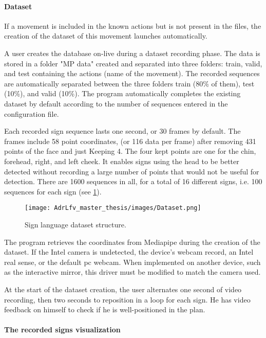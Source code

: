\paragraph{Dataset}

If a movement is included in the known actions but is not present in the files, the creation of the dataset of this movement launches automatically. 

A user creates the database on-live during a dataset recording phase. The data is stored in a folder "MP data" created and separated into three folders: train, valid, and test containing the actions (name of the movement). The recorded sequences are automatically separated between the three folders train (80\% of them), test (10\%), and valid (10\%). The program automatically completes the existing dataset by default according to the number of sequences entered in the configuration file.




Each recorded sign sequence lasts one second, or 30 frames by default. The frames include 58 point coordinates, (or 116 data per frame) after removing 431 points of the face and just Keeping 4. The four kept points are one for the chin, forehead, right, and left cheek. It enables signs using the head to be better detected without recording a large number of points that would not be useful for detection. There are 1600 sequences in all, for a total of 16 different signs, i.e. 100 sequences for each sign (see \ref{fig:slr_dataset}).

\begin{figure}[h]
    \centering
    \texttt{[image: AdrLfv\_master\_thesis/images/Dataset.png]}
    \caption{Sign language dataset structure.}
    \label{fig:slr_dataset}
\end{figure}

The program retrieves the coordinates from Mediapipe during the creation of the dataset. If the Intel camera is undetected, the device's webcam record, an Intel real sense, or the default pc webcam. When implemented on another device, such as the interactive mirror, this driver must be modified to match the camera used.

At the start of the dataset creation, the user alternates one second of video recording, then two seconds to reposition in a loop for each sign. He has video feedback on himself to check if he is well-positioned in the plan.

\paragraph{The recorded signs visualization}

